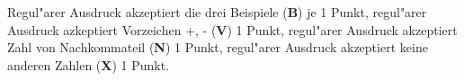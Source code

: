 \begin{bewertung}
Regul"arer Ausdruck akzeptiert die drei Beispiele ({\bf B}) je 1 Punkt,
regul"arer Ausdruck azkeptiert Vorzeichen +, - ({\bf V}) 1 Punkt,
regul"arer Ausdruck akzeptiert Zahl von Nachkommateil ({\bf N}) 1 Punkt,
regul"arer Ausdruck akzeptiert keine anderen Zahlen ({\bf X}) 1 Punkt.
\end{bewertung}

